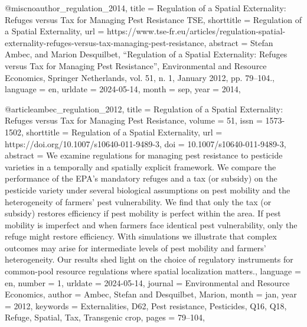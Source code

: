 {{{{@misc{noauthor_regulation_2014,
	title = {Regulation of a {Spatial} {Externality}: {Refuges} versus {Tax} for {Managing} {Pest} {Resistance} {\textbar} {TSE}},
	shorttitle = {Regulation of a {Spatial} {Externality}},
	url = {https://www.tse-fr.eu/articles/regulation-spatial-externality-refuges-versus-tax-managing-pest-resistance},
	abstract = {Stefan Ambec, and Marion Desquilbet, “Regulation of a Spatial Externality: Refuges versus Tax for Managing Pest Resistance”, Environmental and Resource Economics, Springer Netherlands, vol. 51, n. 1, January 2012, pp. 79–104.},
	language = {en},
	urldate = {2024-05-14},
	month = sep,
	year = {2014},
}

@article{ambec_regulation_2012,
	title = {Regulation of a {Spatial} {Externality}: {Refuges} versus {Tax} for {Managing} {Pest} {Resistance}},
	volume = {51},
	issn = {1573-1502},
	shorttitle = {Regulation of a {Spatial} {Externality}},
	url = {https://doi.org/10.1007/s10640-011-9489-3},
	doi = {10.1007/s10640-011-9489-3},
	abstract = {We examine regulations for managing pest resistance to pesticide varieties in a temporally and spatially explicit framework. We compare the performance of the EPA’s mandatory refuges and a tax (or subsidy) on the pesticide variety under several biological assumptions on pest mobility and the heterogeneity of farmers’ pest vulnerability. We find that only the tax (or subsidy) restores efficiency if pest mobility is perfect within the area. If pest mobility is imperfect and when farmers face identical pest vulnerability, only the refuge might restore efficiency. With simulations we illustrate that complex outcomes may arise for intermediate levels of pest mobility and farmers’ heterogeneity. Our results shed light on the choice of regulatory instruments for common-pool resource regulations where spatial localization matters.},
	language = {en},
	number = {1},
	urldate = {2024-05-14},
	journal = {Environmental and Resource Economics},
	author = {Ambec, Stefan and Desquilbet, Marion},
	month = jan,
	year = {2012},
	keywords = {Externalities, D62, Pest resistance, Pesticides, Q16, Q18, Refuge, Spatial, Tax, Transgenic crop},
	pages = {79--104},
}

}}}}
